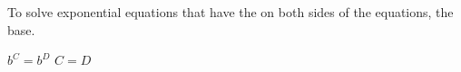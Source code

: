 \begin{minipage}{0.55\textwidth}
    To solve exponential equations that have the
      on both sides of the equations,
     the base.
\end{minipage}
\begin{minipage}{0.44\textwidth}
    \begin{tcolorbox}[center,colback=white,width=2.75in,]
        \centering\large
        $b^C = b^D$ \quad {\Large $\Longleftrightarrow$} \quad $C = D$
    \end{tcolorbox}
\end{minipage}

